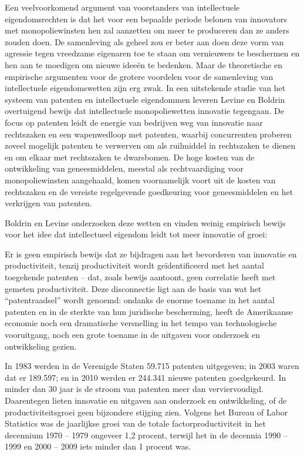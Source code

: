 Een veelvoorkomend argument van voorstanders van intellectuele eigendomsrechten is dat het voor een bepaalde periode belonen van innovators met monopoliewinsten hen zal aanzetten om meer te produceren dan ze anders zouden doen. De samenleving als geheel zou er beter aan doen deze vorm van agressie tegen vreedzame eigenaren toe te staan om vernieuwers te beschermen en hen aan te moedigen om nieuwe ideeën te bedenken. Maar de theoretische en empirische argumenten voor de grotere voordelen voor de samenleving van intellectuele eigendomswetten zijn erg zwak. In een uitstekende studie van het systeem van patenten en intellectuele eigendommen leveren Levine en Boldrin overtuigend bewijs dat intellectuele monopoliewetten innovatie tegengaan. De focus op patenten leidt de energie van bedrijven weg van innovatie naar rechtszaken en een wapenwedloop met patenten, waarbij concurrenten proberen zoveel mogelijk patenten te verwerven om als ruilmiddel in rechtszaken te dienen en om elkaar met rechtszaken te dwarsbomen. De hoge kosten van de ontwikkeling van geneesmiddelen, meestal als rechtvaardiging voor monopoliewinsten aangehaald, komen voornamelijk voort uit de kosten van rechtszaken en de vereiste regelgevende goedkeuring voor geneesmiddelen en het verkrijgen van patenten.

Boldrin en Levine onderzoeken deze wetten en vinden weinig empirisch bewijs voor het idee dat intellectueel eigendom leidt tot meer innovatie of groei:

\begin{blockquotebox}
    Er is geen empirisch bewijs dat ze bijdragen aan het bevorderen van innovatie en productiviteit, tenzij productiviteit wordt geïdentificeerd met het aantal toegekende patenten -- dat, zoals bewijs aantoont, geen correlatie heeft met gemeten productiviteit. Deze disconnectie ligt aan de basis van wat het ``patentraadsel'' wordt genoemd: ondanks de enorme toename in het aantal patenten en in de sterkte van hun juridische bescherming, heeft de Amerikaanse economie noch een dramatische versnelling in het tempo van technologische vooruitgang, noch een grote toename in de uitgaven voor onderzoek en ontwikkeling gezien.
    \par\vspace{1em}\noindent
    In 1983 werden in de Verenigde Staten 59.715 patenten uitgegeven; in 2003 waren dat er 189.597; en in 2010 werden er 244.341 nieuwe patenten goedgekeurd. In minder dan 30 jaar is de stroom van patenten meer dan verviervoudigd. Daarentegen lieten innovatie en uitgaven aan onderzoek en ontwikkeling, of de productiviteitsgroei geen bijzondere stijging zien. Volgens het Bureau of Labor Statistics was de jaarlijkse groei van de totale factorproductiviteit in het decennium 1970 -- 1979 ongeveer 1,2 procent, terwijl het in de decennia 1990 -- 1999 en 2000 -- 2009 iets minder dan 1 procent was.\footnotemark
\end{blockquotebox}
\autocite{89}

